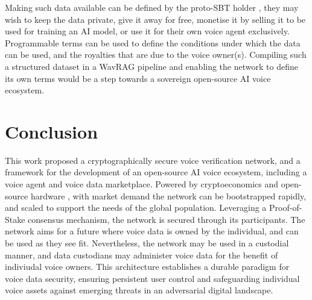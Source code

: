 \documentclass[11pt,a4paper]{article}
\begin{document}
Making such data available can be defined by the proto-SBT holder \cite{erc5484}, they may wish to keep the data private, give it away for free, monetise it by selling it to be used for training an AI model, or use it for their own voice agent exclusively.
Programmable terms can be used to define the conditions under which the data can be used, and the royalties that are due to the voice owner(s).
Compiling such a structured dataset in a WavRAG pipeline \cite{wavrag2024} and enabling the network to define its own terms would be a step towards a sovereign open-source AI voice ecosystem.

\section{Conclusion}
\label{sec:conclusion}
This work proposed a cryptographically secure voice verification network, and a framework for the development of an open-source AI voice ecosystem, including a voice agent and voice data marketplace.
Powered by cryptoeconomics and open-source hardware \cite{originstory2024}, with market demand the network can be bootstrapped rapidly, and scaled to support the needs of the global population.
Leveraging a Proof-of-Stake consensus mechanism, the network is secured through its participants.
The network aims for a future where voice data is owned by the individual, and can be used as they see fit.
Nevertheless, the network may be used in a custodial manner, and data custodians may administer voice data for the benefit of indiviudal voice owners.
This architecture establishes a durable paradigm for voice data security, ensuring persistent user control and safeguarding individual voice assets against emerging threats in an adversarial digital landscape.


\end{document}
